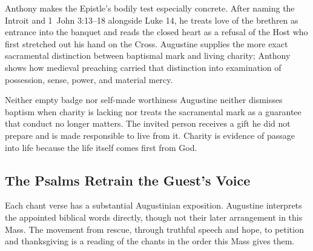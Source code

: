 Anthony makes the Epistle's bodily test especially concrete. After naming the Introit and 1~John 3:13--18 alongside Luke 14, he treats love of the brethren as entrance into the banquet and reads the closed heart as a refusal of the Host who first stretched out his hand on the Cross. Augustine supplies the more exact sacramental distinction between baptismal mark and living charity; Anthony shows how medieval preaching carried that distinction into examination of possession, sense, power, and material mercy.

\begin{massbox}{Neither empty badge nor self-made worthiness}
Augustine neither dismisses baptism when charity is lacking nor treats the sacramental mark as a guarantee that conduct no longer matters. The invited person receives a gift he did not prepare and is made responsible to live from it. Charity is evidence of passage into life because the life itself comes first from God.
\end{massbox}

\sectionguard
\subsection*{The Psalms Retrain the Guest's Voice\enspace{}}

Each chant verse has a substantial Augustinian exposition. Augustine interprets the appointed biblical words directly, though not their later arrangement in this Mass. The movement from rescue, through truthful speech and hope, to petition and thanksgiving is a reading of the chants in the order this Mass gives them.

